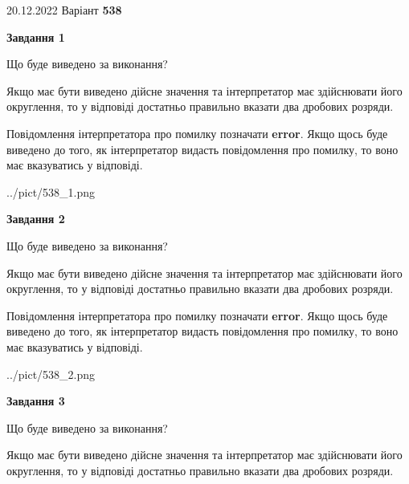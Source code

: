 \documentclass[12pt, ukrainian]{article}
\begin{document}
{20.12.2022 Варіант \No \textbf { 538 }\par}
{
\begin {Large}

{\begin {center}\textbf{Завдання 1}\end {center}}\par
Що буде виведено за виконання? \par

Якщо має бути виведено дійсне значення та інтерпретатор має здійснювати його округлення, 
то у відповіді достатньо правильно вказати два дробових розряди.

Повідомлення інтерпретатора про помилку позначати \textbf{error}.
Якщо щось буде виведено до того, як інтерпретатор видасть повідомлення про помилку, 
то воно має вказуватись у відповіді. \par

\begin{center}
	{../pict/538_1.png}
\end{center}
\newpage

{\begin {center}\textbf{Завдання 2}\end {center}}\par
Що буде виведено за виконання? \par

Якщо має бути виведено дійсне значення та інтерпретатор має здійснювати його округлення, 
то у відповіді достатньо правильно вказати два дробових розряди.

Повідомлення інтерпретатора про помилку позначати \textbf{error}.
Якщо щось буде виведено до того, як інтерпретатор видасть повідомлення про помилку, 
то воно має вказуватись у відповіді. \par

\begin{center}
	{../pict/538_2.png}
\end{center}
\newpage

{\begin {center}\textbf{Завдання 3}\end {center}}\par
Що буде виведено за виконання? \par

Якщо має бути виведено дійсне значення та інтерпретатор має здійснювати його округлення, 
то у відповіді достатньо правильно вказати два дробових розряди.


\end{Large}}
\end{document}
